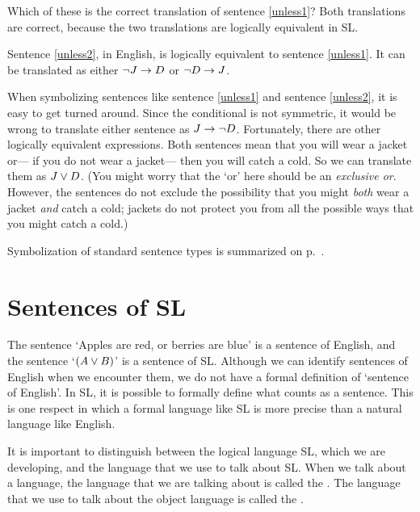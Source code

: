 Which of these is the correct translation of sentence \ref{unless1}? Both translations are correct, because the two translations are logically equivalent in SL.

Sentence \ref{unless2}, in English, is logically equivalent to sentence \ref{unless1}. It can be translated as either $\neg J \rightarrow D$ or $\neg D \rightarrow J$.

When symbolizing sentences like sentence \ref{unless1} and sentence \ref{unless2}, it is easy to get turned around. Since the conditional is not symmetric, it would be wrong to translate either sentence as $J \rightarrow \neg D$. Fortunately, there are other logically equivalent expressions. Both sentences mean that you will wear a jacket or--- if you do not wear a jacket--- then you will catch a cold. So we can translate them as $J \vee D$. (You might worry that the `or' here should be an \emph{exclusive or}. However, the sentences do not exclude the possibility that you might \emph{both} wear a jacket \emph{and} catch a cold; jackets do not protect you from all the possible ways that you might catch a cold.)



Symbolization of standard sentence types is summarized on p.~\pageref{app.symbolization}.





\section{Sentences of SL}
The sentence `Apples are red, or berries are blue' is a sentence of English, and the sentence `$(A\vee B)$' is a sentence of SL. Although we can identify sentences of English when we encounter them, we do not have a formal definition of `sentence of English'. In SL, it is possible to formally define what counts as a sentence. This is one respect in which a formal language like SL is more precise than a natural language like English.

It is important to distinguish between the logical language SL, which we are developing, and the language that we use to talk about SL. When we talk about a language, the language that we are talking about is called the . The language that we use to talk about the object language is called the .
\label{def.metalanguage}

